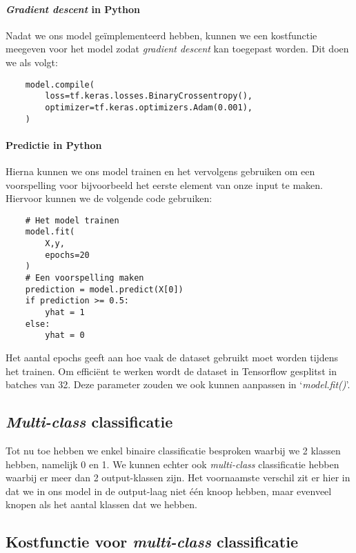\paragraph{\textit{Gradient descent} in Python}
Nadat we ons model geïmplementeerd hebben, kunnen we een kostfunctie meegeven voor het model zodat \textit{gradient descent } kan toegepast worden. Dit doen we als volgt:

\begin{lstlisting}
	model.compile(
	    loss=tf.keras.losses.BinaryCrossentropy(),
	    optimizer=tf.keras.optimizers.Adam(0.001),
	)
\end{lstlisting}

\paragraph{Predictie in Python}
Hierna kunnen we ons model trainen en het vervolgens gebruiken om een voorspelling voor bijvoorbeeld het eerste element van onze input te maken. Hiervoor kunnen we de volgende code gebruiken:

\begin{lstlisting}
	# Het model trainen
	model.fit(
	    X,y,
	    epochs=20
	)
	# Een voorspelling maken
	prediction = model.predict(X[0])
	if prediction >= 0.5:
	    yhat = 1
	else:
	    yhat = 0
\end{lstlisting}
\noindent
Het aantal epochs geeft aan hoe vaak de dataset gebruikt moet worden tijdens het trainen. Om efficiënt te werken wordt de dataset in Tensorflow gesplitst in batches van 32. Deze parameter zouden we ook kunnen aanpassen in `\textit{model.fit()}'.

\subsection{\textit{Multi-class} classificatie}

Tot nu toe hebben we enkel binaire classificatie besproken waarbij we 2 klassen hebben, namelijk 0 en 1. We kunnen echter ook \textit{multi-class} classificatie hebben waarbij er meer dan 2 output-klassen zijn. Het voornaamste verschil zit er hier in dat we in ons model in de output-laag niet één knoop hebben, maar evenveel knopen als het aantal klassen dat we hebben.

\subsection{Kostfunctie voor \textit{multi-class} classificatie}

